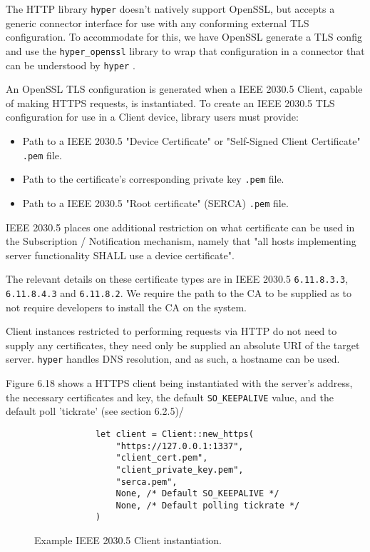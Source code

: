 The HTTP library \texttt{hyper} doesn't natively support OpenSSL, but accepts a generic connector interface for use with any conforming external TLS configuration. To accommodate for this, we have OpenSSL generate a TLS config and use the \texttt{hyper\_openssl} library to wrap that configuration in a connector that can be understood by \texttt{hyper} \cite{hyperopenssl}. 

An OpenSSL TLS configuration is generated when a IEEE 2030.5 Client, capable of making HTTPS requests, is instantiated. To create an IEEE 2030.5 TLS configuration for use in a Client device, library users must provide:

\begin{itemize}
    \item Path to a IEEE 2030.5 "Device Certificate" or "Self-Signed Client Certificate" \texttt{.pem} file.
    \item Path to the certificate's corresponding private key \texttt{.pem} file.
    \item Path to a IEEE 2030.5 "Root certificate" (SERCA) \texttt{.pem} file. 
\end{itemize}

IEEE 2030.5 places one additional restriction on what certificate can be used in the Subscription / Notification mechanism, namely that "all hosts implementing server functionality SHALL use a device certificate".

The relevant details on these certificate types are in IEEE 2030.5 \texttt{6.11.8.3.3}, \texttt{6.11.8.4.3} and \texttt{6.11.8.2}. We require the path to the CA to be supplied as to not require developers to install the CA on the system.

Client instances restricted to performing requests via HTTP do not need to supply any certificates, they need only be supplied an absolute URI of the target server. \texttt{hyper} handles DNS resolution, and as such, a hostname can be used.

Figure 6.18 shows a HTTPS client being instantiated with the server's address, the necessary certificates and key, the default \texttt{SO\_KEEPALIVE} value, and the default poll 'tickrate' (see section 6.2.5)/  

\begin{figure}[h]
    \begin{center}
        \begin{lstlisting}
            let client = Client::new_https(
                "https://127.0.0.1:1337",
                "client_cert.pem",
                "client_private_key.pem",
                "serca.pem",
                None, /* Default SO_KEEPALIVE */
                None, /* Default polling tickrate */
            )
        \end{lstlisting}
        \label{fig:httpsclientexample}
        \vspace{-10pt}
        \caption{Example IEEE 2030.5 Client instantiation.}
    \end{center}
\end{figure}



